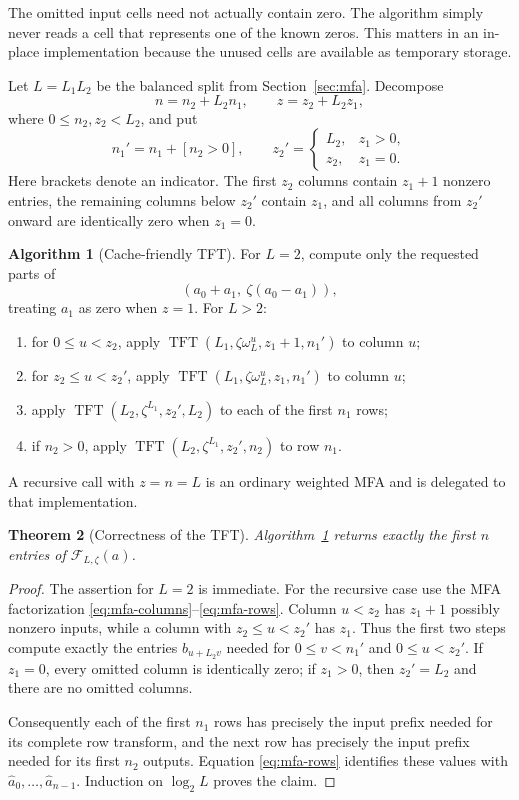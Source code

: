 \documentclass[11pt]{book}
\newtheorem{theorem}{Theorem}[section]
\theoremstyle{definition}
\newtheorem{algorithm}[theorem]{Algorithm}
\begin{document}
The omitted input cells need not actually contain zero.  The algorithm simply
never reads a cell that represents one of the known zeros.  This matters in an
in-place implementation because the unused cells are available as temporary
storage.

Let $L=L_1L_2$ be the balanced split from Section~\ref{sec:mfa}.  Decompose
\[
 n=n_2+L_2n_1,\qquad z=z_2+L_2z_1,
\]
where $0\leq n_2,z_2<L_2$, and put
\[
 n_1'=n_1+[n_2>0],\qquad
 z_2'=\begin{cases}L_2,&z_1>0,\\ z_2,&z_1=0.\end{cases}
\]
Here brackets denote an indicator.  The first $z_2$ columns contain $z_1+1$
nonzero entries, the remaining columns below $z_2'$ contain $z_1$, and all
columns from $z_2'$ onward are identically zero when $z_1=0$.

\begin{algorithm}[Cache-friendly TFT]\label{alg:tft}
For $L=2$, compute only the requested parts of
\[
 (a_0+a_1,\ \zeta(a_0-a_1)),
\]
treating $a_1$ as zero when $z=1$.  For $L>2$:
\begin{enumerate}
 \item for $0\leq u<z_2$, apply
 $\operatorname{TFT}(L_1,\zeta\omega_L^u,z_1+1,n_1')$ to column $u$;
 \item for $z_2\leq u<z_2'$, apply
 $\operatorname{TFT}(L_1,\zeta\omega_L^u,z_1,n_1')$ to column $u$;
 \item apply $\operatorname{TFT}(L_2,\zeta^{L_1},z_2',L_2)$ to each of the
 first $n_1$ rows;
 \item if $n_2>0$, apply
 $\operatorname{TFT}(L_2,\zeta^{L_1},z_2',n_2)$ to row $n_1$.
\end{enumerate}
A recursive call with $z=n=L$ is an ordinary weighted MFA and is delegated to
that implementation.
\end{algorithm}

\begin{theorem}[Correctness of the TFT]\label{thm:tft-correct}
Algorithm~\ref{alg:tft} returns exactly the first $n$ entries of
$\mathcal F_{L,\zeta}(a)$.
\end{theorem}

\begin{proof}
The assertion for $L=2$ is immediate.  For the recursive case use the MFA
factorization \eqref{eq:mfa-columns}--\eqref{eq:mfa-rows}.  Column $u<z_2$
has $z_1+1$ possibly nonzero inputs, while a column with
$z_2\leq u<z_2'$ has $z_1$.  Thus the first two steps compute exactly the
entries $b_{u+L_2v}$ needed for $0\leq v<n_1'$ and $0\leq u<z_2'$.
If $z_1=0$, every omitted column is identically zero; if $z_1>0$, then
$z_2'=L_2$ and there are no omitted columns.

Consequently each of the first $n_1$ rows has precisely the input prefix
needed for its complete row transform, and the next row has precisely the
input prefix needed for its first $n_2$ outputs.  Equation
\eqref{eq:mfa-rows} identifies these values with
$\widehat a_0,\ldots,\widehat a_{n-1}$.  Induction on $\log_2L$ proves the
claim.
\end{proof}
\end{document}
